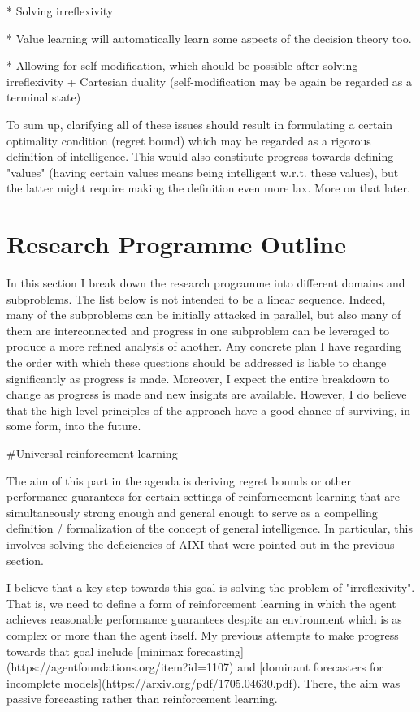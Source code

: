 \documentclass[a4paper]{article}
\begin{document}
* Solving irreflexivity

* Value learning will automatically learn some aspects of the decision theory too.

* Allowing for self-modification, which should be possible after solving irreflexivity + Cartesian duality (self-modification may be again be regarded as a terminal state)

To sum up, clarifying all of these issues should result in formulating a certain optimality condition (regret bound) which may be regarded as a rigorous definition of intelligence. This would also constitute progress towards defining "values" (having certain values means being intelligent w.r.t. these values), but the latter might require making the definition even more lax. More on that later.

\section{Research Programme Outline}

In this section I break down the research programme into different domains and subproblems. The list below is not intended to be a linear sequence. Indeed, many of the subproblems can be initially attacked in parallel, but also many of them are interconnected and progress in one subproblem can be leveraged to produce a more refined analysis of another. Any concrete plan I have regarding the order with which these questions should be addressed is liable to change significantly as progress is made. Moreover, I expect the entire breakdown to change as progress is made and new insights are available. However, I do believe that the high-level principles of the approach have a good chance of surviving, in some form, into the future.

\#Universal reinforcement learning

The aim of this part in the agenda is deriving regret bounds or other performance guarantees for certain settings of reinforncement learning that are simultaneously strong enough and general enough to serve as a compelling definition / formalization of the concept of general intelligence. In particular, this involves solving the deficiencies of AIXI that were pointed out in the previous section.

I believe that a key step towards this goal is solving the problem of "irreflexivity". That is, we need to define a form of reinforcement learning in which the agent achieves reasonable performance guarantees despite an environment which is as complex or more than the agent itself. My previous attempts to make progress towards that goal include [minimax forecasting](https://agentfoundations.org/item?id=1107) and [dominant forecasters for incomplete models](https://arxiv.org/pdf/1705.04630.pdf). There, the aim was passive forecasting rather than reinforcement learning.
\end{document}
